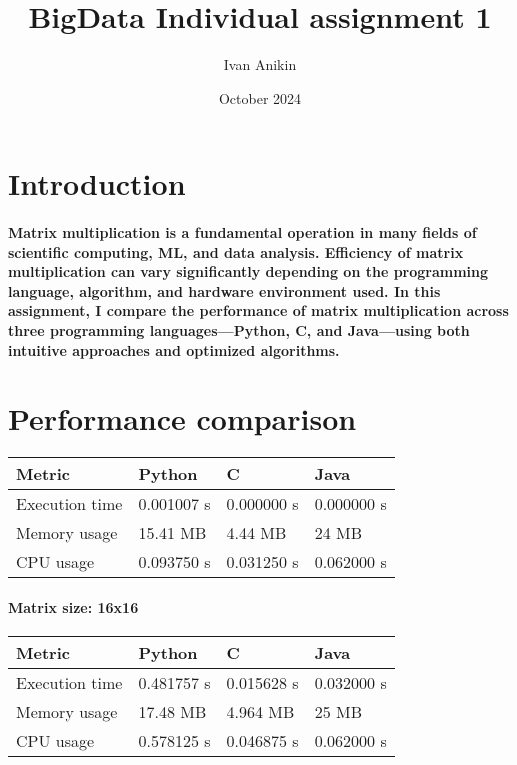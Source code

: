 \documentclass{article}
\title{BigData Individual assignment 1}
\author{Ivan Anikin}
\date{October 2024}
\begin{document}
\maketitle



\section{Introduction}

\paragraph{Matrix multiplication is a fundamental operation in many fields of scientific computing, ML, and data analysis. Efficiency of matrix multiplication can vary significantly depending on the programming language, algorithm, and hardware environment used. In this assignment, I compare the performance of matrix multiplication across three programming languages—Python, C, and Java—using both intuitive approaches and optimized algorithms. }

\hfill 
\newline

\section{Performance comparison}

\begin{tabular}{| l | l | l | l |}
\hline
Metric & Python & C & Java \\ \hline
Execution time & 0.001007 s & 0.000000 s & 0.000000 s \\ \hline
Memory usage & 15.41 MB & 4.44 MB & 24 MB \\ \hline
CPU usage & 0.093750 s & 0.031250 s & 0.062000 s \\
\hline
\end{tabular}
\paragraph{Matrix size: 16x16}

\hfill 
\newline

\begin{tabular}{| l | l | l | l |}
\hline
Metric & Python & C & Java \\ \hline
Execution time & 0.481757 s & 0.015628 s & 0.032000 s \\ \hline
Memory usage & 17.48 MB & 4.964 MB & 25 MB \\ \hline
CPU usage & 0.578125 s & 0.046875 s & 0.062000 s \\
\hline
\end{tabular}
\end{document}

